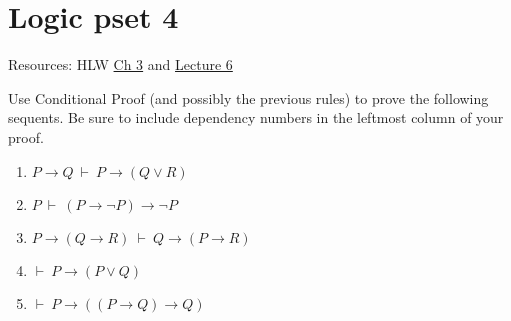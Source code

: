 \documentclass[fleqn,12pt]{article}
\begin{document}
\thispagestyle{empty}

\section*{Logic pset 4}

Resources: HLW \href{https://www.jstor.org/stable/j.ctvxrpz0q.6}{Ch 3}
and
\href{https://princeton.hosted.panopto.com/Panopto/Pages/Viewer.aspx?id=748f0cd0-1329-4bd9-9e2a-acbf0155b44c}{Lecture
  6}

Use Conditional Proof (and possibly the previous rules) to prove the
following sequents. Be sure to include dependency numbers in the
leftmost column of your proof.
\begin{enumerate}
\item $P\to Q\:\vdash\: P\to (Q\vee R)$
\item $P\:\vdash\: (P\to\neg P)\to \neg P$
\item $P\to (Q\to R)\:\vdash\: Q\to (P\to R)$  
\item $\vdash\: P\to (P\vee Q)$
\item $\vdash\: P\to ((P\to Q)\to Q)$
\end{enumerate}     
\end{document}
